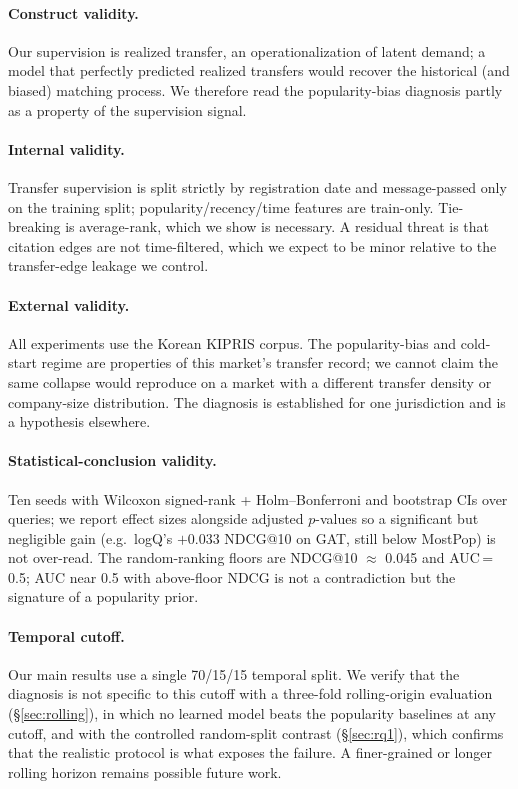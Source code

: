 \documentclass[preprint,12pt]{elsarticle}
\begin{document}
\paragraph{Construct validity.} Our supervision is realized transfer, an
operationalization of latent demand; a model that perfectly predicted realized
transfers would recover the historical (and biased) matching process. We therefore
read the popularity-bias diagnosis partly as a property of the supervision signal.

\paragraph{Internal validity.} Transfer supervision is split strictly by registration
date and message-passed only on the training split; popularity/recency/time features
are train-only. Tie-breaking is average-rank, which we show is necessary. A residual
threat is that citation edges are not time-filtered, which we expect to be minor
relative to the transfer-edge leakage we control.

\paragraph{External validity.} All experiments use the Korean KIPRIS corpus. The
popularity-bias and cold-start regime are properties of this market's transfer record;
we cannot claim the same collapse would reproduce on a market with a different transfer
density or company-size distribution. The diagnosis is established for one jurisdiction
and is a hypothesis elsewhere.

\paragraph{Statistical-conclusion validity.} Ten seeds with Wilcoxon signed-rank +
Holm--Bonferroni and bootstrap CIs over queries; we report effect sizes alongside
adjusted $p$-values so a significant but negligible gain (e.g.\ logQ's $+0.033$ NDCG@10
on GAT, still below MostPop) is not over-read. The random-ranking floors are
NDCG@10 $\approx$ 0.045 and AUC\,=\,0.5; AUC near 0.5 with above-floor NDCG is not a
contradiction but the signature of a popularity prior.

\paragraph{Temporal cutoff.} Our main results use a single 70/15/15 temporal split. We
verify that the diagnosis is not specific to this cutoff with a three-fold
rolling-origin evaluation (\S\ref{sec:rolling}), in which no learned model beats the
popularity baselines at any cutoff, and with the controlled random-split contrast
(\S\ref{sec:rq1}), which confirms that the realistic protocol is what exposes the
failure. A finer-grained or longer rolling horizon remains possible future work.
\end{document}

